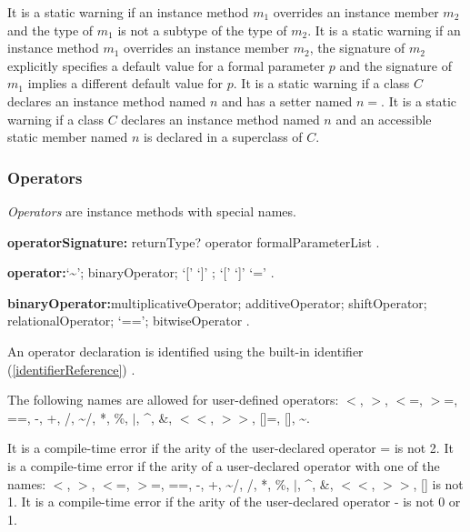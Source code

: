 \documentclass{article}
\newcommand{\code}[1]{{\sf #1}}
\begin{document}
\LMHash{}
It is a static warning if an instance method $m_1$ overrides an instance member $m_2$ and the type of $m_1$ is not a subtype of the type of $m_2$. It is a static warning if an instance method $m_1$ overrides an instance member $m_2$,  the signature of $m_2$ explicitly specifies a default value for a formal parameter $p$ and the signature of $m_1$ implies a different default value for $p$. It is a static warning if a class $C$ declares an instance method named $n$ and has a setter named $n=$. It is a static warning if a class $C$ declares an instance method named $n$ and an accessible static member named $n$ is declared in a superclass of $C$.



\subsubsection{Operators}

\LMHash{}
{\em Operators} are instance methods with special names.

\begin{grammar}
{\bf operatorSignature:}
       returnType? \OPERATOR{} operator formalParameterList
       .

 {\bf operator:}`\~{}';
      binaryOperator;
      `[' `]' ;
      `[' `]' `='
    .

{\bf binaryOperator:}multiplicativeOperator;
      additiveOperator;
      shiftOperator;
      relationalOperator;
      `==';
      bitwiseOperator
    .
 \end{grammar}

\LMHash{}
An operator declaration is identified using the built-in identifier (\ref{identifierReference}) \OPERATOR{}.

\LMHash{}
The following names are allowed for user-defined operators: \code{$<$, $>$, $<$=, $>$=, ==,  -, +, /, \~{}/, *, \%, $|$, \^{}, \&, $<<$, $>>$,  []=, [], \~{}.}


\LMHash{}
It is a compile-time error if the arity of the user-declared operator \code{[]=} is not 2. It is a compile-time error if the arity of a user-declared operator with one of the names:  \code{ $<$, $>$, $<$=, $>$=, ==, -, +,  \~{}/, /, *, \%, $|$, \^{}, \&, $<<$, $>>$, []} is not 1. It is a compile-time error if the arity of the user-declared operator  \code{-} is not 0 or 1.
\end{document}
